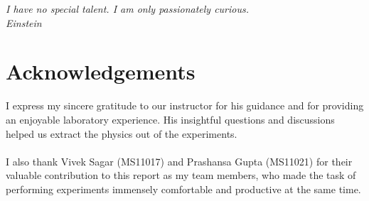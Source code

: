 
\begin{flushright}{\slshape    
I have no special talent. I am only passionately curious.\\
Einstein}
\end{flushright}



\bigskip

\begingroup
\let\clearpage\relax
\let\cleardoublepage\relax
\let\cleardoublepage\relax
\chapter*{Acknowledgements}
I express my sincere gratitude to our instructor \myProf for his guidance and for providing an enjoyable laboratory experience. His insightful questions and discussions helped us extract the physics out of the experiments.\\
 \\
I also thank Vivek Sagar (MS11017) and Prashansa Gupta (MS11021) for their valuable contribution to this report as my team members, who made the task of performing experiments immensely comfortable and productive at the same time.\\


\bigskip


\endgroup




